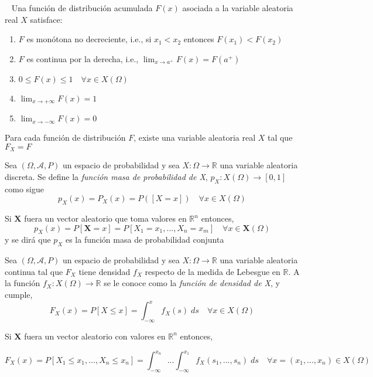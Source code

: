     \begin{proposicion}~\smallskip
    Una función de distribución acumulada $F(x)$ asociada a la variable aleatoria real $X$  satisface:
    \begin{enumerate}
        \item $F$ es monótona no decreciente, i.e., si $x_1 < x_2$ entonces $F(x_1) < F(x_2)$
        \item $F$ es continua por la derecha, i.e., $\lim_{x \to a^+}F(x) = F(a^+)$
        \item $0 \leq F(x) \leq 1 \quad \forall x \in X(\Omega)$
        \item $\lim_{x \to + \infty}F(x) = 1$
        \item $\lim_{x \to -\infty}F(x) = 0$
    \end{enumerate}
    
    \end{proposicion}
    
    \begin{teorema}
    Para cada función de distribución $F$, existe una variable aleatoria real $X$ tal que $F_X = F$
    \end{teorema}
    
    \begin{definicion}
        Sea $(\Omega, \mathcal{A}, P)$ un espacio de probabilidad y sea $X:\Omega \to \mathbb{R}$ una variable aleatoria discreta. Se define la \textit{función masa de probabilidad de X}, $p_X:X(\Omega) \to [0,1]$ como sigue
        $$p_X(x) = P_X(x) = P([X=x]) \quad \forall x \in X(\Omega)$$
        
        Si $\mathbf{X}$ fuera un vector aleatorio que toma valores en $\mathbb{R}^n$ entonces,
        $$p_X(x) = P[\mathbf{X} = x] = P[X_1 = x_1,...,X_n = x_m] \quad \forall x \in \mathbf{X}(\Omega)$$
        y se dirá que $p_X$ es la función masa de probabilidad conjunta
    
    \end{definicion}
    
    \begin{definicion}
    Sea $(\Omega, \mathcal{A}, P)$ un espacio de probabilidad y sea $X:\Omega \to \mathbb{R}$ una variable aleatoria continua tal que $F_X$ tiene densidad $f_X$ respecto de la medida de Lebesgue en $\mathbb{R}$. A la función $f_X:X(\Omega) \to \mathbb{R}$ se le conoce como la \textit{función de densidad de X}, y cumple,
    $$F_X(x) = P[X \leq x] = \int_{-\infty}^x f_X(s) \; ds \quad \forall x \in X(\Omega)$$
    
    Si $\mathbf{X}$ fuera un vector aleatorio con valores en $\mathbb{R}^n$ entonces,
    
    $$F_X(x) = P[X_1 \leq x_1,...,X_n \leq x_n] = \int_{-\infty}^{x_n} ... \int_{-\infty}^{x_1} f_X(s_1,...,s_n) \; ds \quad \forall x = (x_1,...,x_n) \in X(\Omega)$$
    \end{definicion}
    
